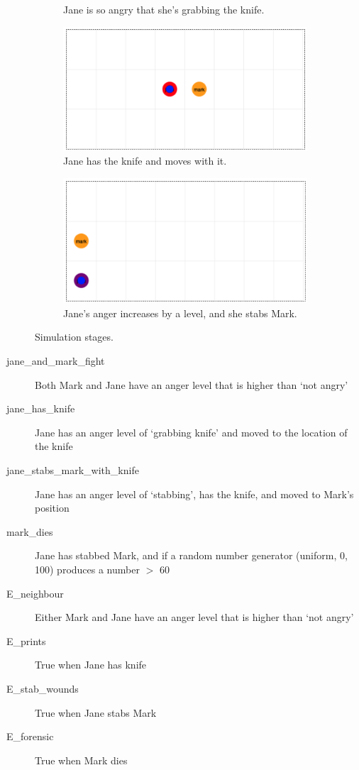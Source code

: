 \begin{example}
\begin{figure}[htbp]
\begin{center}
\begin{subfigure}{.5\textwidth}
\caption{Jane is so angry that she's grabbing the knife.}
\label{default}
\end{subfigure}
\begin{subfigure}{.5\textwidth}
\includegraphics[width=0.9\linewidth]{images/walkthroughSim/s4.png}
\caption{Jane has the knife and moves with it.}
\label{default}
\end{subfigure}
\begin{subfigure}{.5\textwidth}
\includegraphics[width=0.9\linewidth]{images/walkthroughSim/s5.png}
\caption{Jane's anger increases by a level, and she stabs Mark.}
\label{default}
\end{subfigure}
\caption{Simulation stages.}
\end{center}
\label{tribute}
\end{figure}


\begin{description}
\item[jane\_and\_mark\_fight ]  Both Mark and Jane have an anger level that is higher than `not angry'
\item[jane\_has\_knife ] Jane has an anger level of `grabbing knife' and moved to the location of the knife
\item[jane\_stabs\_mark\_with\_knife ] Jane has an anger level of `stabbing', has the knife, and moved to Mark's position
\item[mark\_dies ] Jane has stabbed Mark, and if a random number generator (uniform, 0, 100) produces a number $>$ 60
\item[E\_neighbour ] Either Mark and Jane have an anger level that is higher than `not angry'
\item[E\_prints ] True when Jane has knife
\item[E\_stab\_wounds ] True when Jane stabs Mark
\item[E\_forensic ] True when Mark dies


\end{description}
\end{example}
